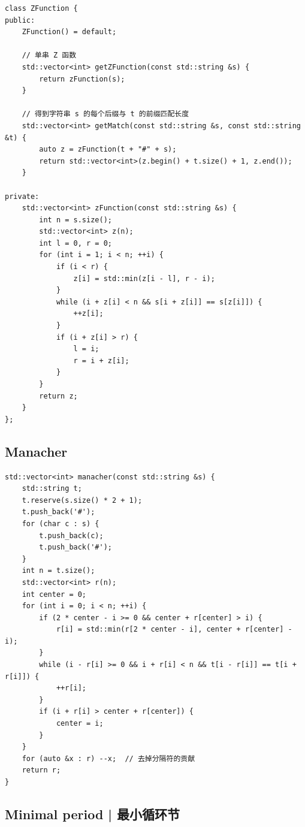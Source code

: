     \begin{lstlisting}
class ZFunction {
public:
    ZFunction() = default;

    // 单串 Z 函数
    std::vector<int> getZFunction(const std::string &s) {
        return zFunction(s);
    }

    // 得到字符串 s 的每个后缀与 t 的前缀匹配长度
    std::vector<int> getMatch(const std::string &s, const std::string &t) {
        auto z = zFunction(t + "#" + s);
        return std::vector<int>(z.begin() + t.size() + 1, z.end());
    }

private:
    std::vector<int> zFunction(const std::string &s) {
        int n = s.size();
        std::vector<int> z(n);
        int l = 0, r = 0;
        for (int i = 1; i < n; ++i) {
            if (i < r) {
                z[i] = std::min(z[i - l], r - i);
            }
            while (i + z[i] < n && s[i + z[i]] == s[z[i]]) {
                ++z[i];
            }
            if (i + z[i] > r) {
                l = i;
                r = i + z[i];
            }
        }
        return z;
    }
};
    \end{lstlisting}

\subsection{Manacher}


    \begin{lstlisting}
std::vector<int> manacher(const std::string &s) {
    std::string t;
    t.reserve(s.size() * 2 + 1);
    t.push_back('#');
    for (char c : s) {
        t.push_back(c);
        t.push_back('#');
    }
    int n = t.size();
    std::vector<int> r(n);
    int center = 0;
    for (int i = 0; i < n; ++i) {
        if (2 * center - i >= 0 && center + r[center] > i) {
            r[i] = std::min(r[2 * center - i], center + r[center] - i);
        }
        while (i - r[i] >= 0 && i + r[i] < n && t[i - r[i]] == t[i + r[i]]) {
            ++r[i];
        }
        if (i + r[i] > center + r[center]) {
            center = i;
        }
    }
    for (auto &x : r) --x;  // 去掉分隔符的贡献
    return r;
}
    \end{lstlisting}

\subsection{Minimal period | 最小循环节}

